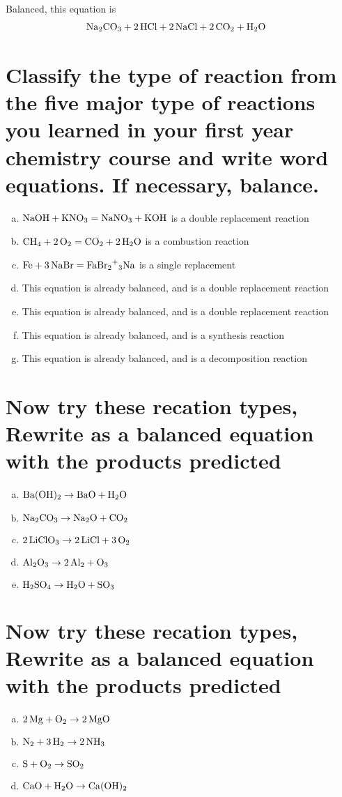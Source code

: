 \documentclass{scrartcl}
\begin{document}
Balanced, this equation is
\begin{align*}
&\ce{Na2CO3 + 2HCl}+\ce{2NaCl + 2CO2 + H2O}
\end{align*}

\section{Classify the type of reaction from the five major type of reactions you learned in your first year chemistry course and write word equations. If necessary, balance.}
\label{sec:org6521d97}
\begin{enumerate}[a.]
\item \(\ce{NaOH + KNO3}=\ce{NaNO3 + KOH}\) is a double replacement reaction
\item \(\ce{CH4 + 2O2}=\ce{CO2 + 2H2O}\) is a combustion reaction
\item \(\ce{Fe + 3NaBr}=\ce{FaBr2+3Na}\) is a single replacement
\item This equation is already balanced, and is a double replacement reaction
\item This equation is already balanced, and is a double replacement reaction
\item This equation is already balanced, and is a synthesis reaction
\item This equation is already balanced, and is a decomposition reaction
\end{enumerate}

\section{Now try these recation types, Rewrite as a balanced equation with the products predicted}
\label{sec:org6e73fbb}
\begin{enumerate}[a.]
\item \(\ce{Ba(OH)2}\rightarrow\ce{BaO + H2O}\)
\item \(\ce{Na2CO3}\rightarrow\ce{Na2O + CO2}\)
\item \(\ce{2LiClO3}\rightarrow\ce{2LiCl + 3O2}\)
\item \(\ce{Al2O3}\rightarrow\ce{2Al2 + O3}\)
\item \(\ce{H2SO4}\rightarrow\ce{H2O + SO3}\)
\end{enumerate}

\section{Now try these recation types, Rewrite as a balanced equation with the products predicted}
\label{sec:org2a66270}
\begin{enumerate}[a.]
\item \(\ce{2Mg + O2}\rightarrow\ce{2MgO}\)
\item \(\ce{N2 + 3H2}\rightarrow\ce{2NH3}\)
\item \(\ce{S + O2}\rightarrow\ce{SO2}\)
\item \(\ce{CaO + H2O}\rightarrow\ce{Ca(OH)2}\)
\end{enumerate}
\end{document}
